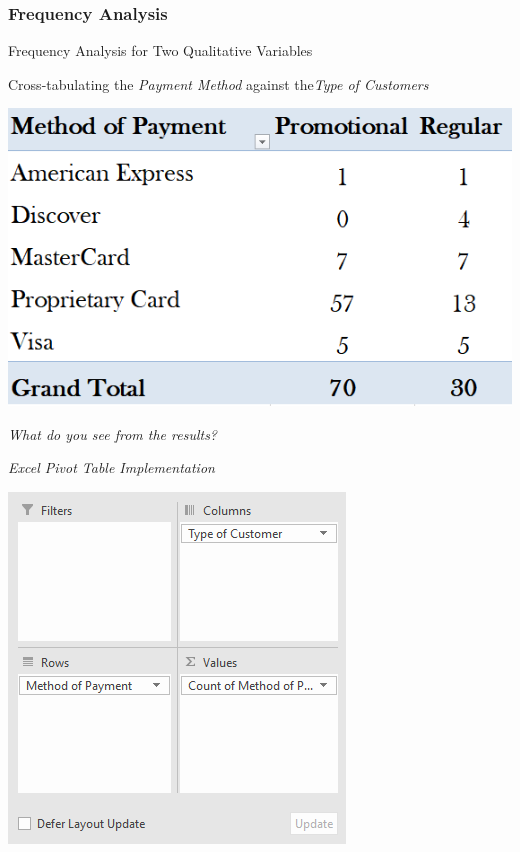 \documentclass{beamer}
\begin{document}
\subsubsection{Frequency Analysis}
\begin{frame}{Frequency Analysis for Two Qualitative Variables}

\begin{center}
Cross-tabulating the \textit{Payment Method} against the\textit{Type of Customers}

\end{center}
\begin{multicols}{2}
\begin{center}
\includegraphics[scale=0.4]{images/ch2CrossTabQulitative.png}

\textit{What do you see from the results? 
}

\end{center}

\begin{center}

\vspace{3cm}
\begin{scriptsize}
\textit{Excel Pivot Table Implementation
}
\end{scriptsize}

\includegraphics[scale=0.4]{images/ch2CrossTabQulitativePivot.png}
\end{center}

\end{multicols}


\end{frame}
\end{document}
